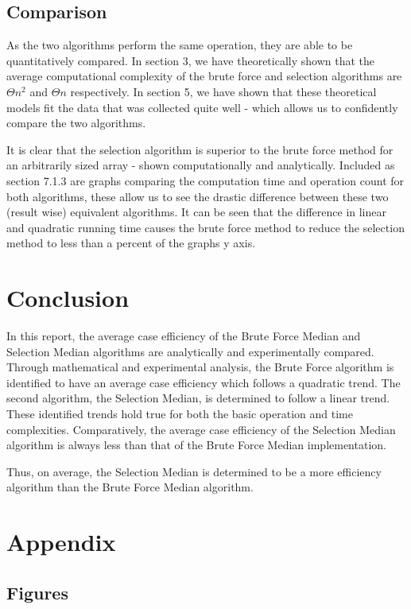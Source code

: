 \documentclass{article}
\begin{document}
    \subsection{Comparison}
        As the two algorithms perform the same operation, they are able to be quantitatively compared. In section 3, we have theoretically shown that the average computational complexity of the brute force and selection algorithms are $\Theta{n^2}$ and $\Theta{n}$ respectively. In section 5, we have shown that these theoretical models fit the data that was collected quite well - which allows us to confidently compare the two algorithms.

        It is clear that the selection algorithm is superior to the brute force method for an arbitrarily sized array - shown computationally and analytically. Included as section 7.1.3 are graphs comparing the computation time and operation count for both algorithms, these allow us to see the drastic difference between these two (result wise) equivalent algorithms. It can be seen that the difference in linear and quadratic running time causes the brute force method to reduce the selection method to less than a percent of the graphs y axis.
\section{Conclusion}
    In this report, the average case efficiency of the Brute Force Median and Selection Median algorithms are analytically and experimentally compared. Through mathematical and experimental analysis, the Brute Force algorithm is identified to have an average case efficiency which follows a quadratic trend. The second algorithm, the Selection Median, is determined to follow a linear trend. These identified trends hold true for both the basic operation and time complexities. Comparatively, the average case efficiency of the Selection Median algorithm is always less than that of the Brute Force Median implementation. 

    Thus, on average, the Selection Median is determined to be a more efficiency algorithm than the Brute Force Median algorithm.
\newpage
\section{Appendix}
    \subsection{Figures}
\end{document}
